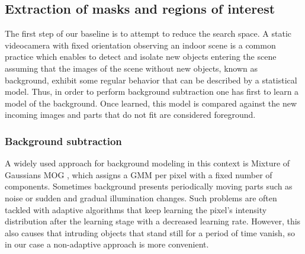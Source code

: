 \documentclass[10pt,twocolumn,letterpaper]{article}
\begin{document}

\subsection{Extraction of masks and regions of interest} 
\label{ssec:bsbb}

The first step of our baseline is to attempt to reduce the search space. A static videocamera with fixed orientation observing an indoor scene is a common practice which enables to detect and isolate new objects entering the scene assuming that the images of the scene without new objects, known as background, exhibit some regular behavior that can be described by a statistical model. Thus, in order to perform background subtraction one has first to learn a model of the background. Once learned, this model is compared against the new incoming images and parts that do not fit are considered foreground.

\subsubsection{Background subtraction}
\label{sect:bs}
 A widely used approach for background modeling in this context is Mixture of Gaussians MOG  \cite{bouwmans2008background}, which assigns a GMM per pixel with a fixed number of components. Sometimes background presents periodically moving parts such as noise or sudden and gradual illumination changes. Such problems are often tackled with adaptive algorithms that keep learning the pixel's intensity distribution after the learning stage with a decreased learning rate. However, this also causes that intruding objects that stand still for a period of time vanish, so in our case a non-adaptive approach is more convenient.
\end{document}
